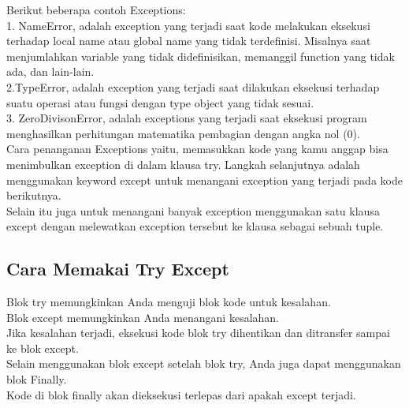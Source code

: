 Berikut beberapa contoh Exceptions:\\
1. NameError, adalah exception yang terjadi saat kode melakukan eksekusi terhadap local name atau global name yang tidak terdefinisi. Misalnya saat menjumlahkan variable yang tidak didefinisikan, memanggil function yang tidak ada, dan lain-lain.\\
2.TypeError, adalah exception yang terjadi saat dilakukan eksekusi terhadap suatu operasi atau fungsi dengan type object yang tidak sesuai.\\
3. ZeroDivisonError, adalah exceptions yang terjadi saat eksekusi program menghasilkan perhitungan matematika pembagian dengan angka nol (0).\\

Cara penanganan Exceptions yaitu, memasukkan kode yang kamu anggap bisa menimbulkan exception di dalam klausa try. Langkah selanjutnya adalah menggunakan keyword except untuk menangani
exception yang terjadi pada kode berikutnya.\\

Selain itu juga untuk menangani banyak exception menggunakan satu klausa except dengan melewatkan exception tersebut ke klausa sebagai sebuah tuple.

\subsection{Cara Memakai Try Except}

Blok try memungkinkan Anda menguji blok kode untuk kesalahan.\\
Blok except memungkinkan Anda menangani kesalahan.\\

Jika kesalahan terjadi, eksekusi kode blok try dihentikan dan ditransfer sampai ke blok except. \\
Selain menggunakan blok except setelah blok try, Anda juga dapat menggunakan blok Finally. \\
Kode di blok finally akan dieksekusi terlepas dari apakah except terjadi.\\

